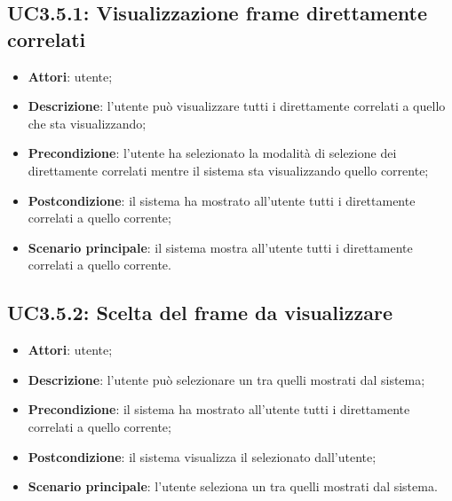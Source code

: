 \subsection{UC3.5.1: Visualizzazione frame direttamente correlati}
\label{UC3.5.1}
\begin{itemize}
\item \textbf{Attori}: utente;
\item \textbf{Descrizione}: l'utente può visualizzare tutti i  direttamente correlati a quello che sta visualizzando;
\item \textbf{Precondizione}: l’utente ha selezionato la modalità di selezione dei  direttamente correlati mentre il sistema sta visualizzando quello corrente;
\item \textbf{Postcondizione}: il sistema ha mostrato all'utente tutti i  direttamente correlati a quello corrente;
\item \textbf{Scenario principale}:
il sistema mostra all'utente tutti i  direttamente correlati a quello corrente.
\end{itemize}
\subsection{UC3.5.2: Scelta del frame da visualizzare}
\label{UC3.5.2}
\begin{itemize}
\item \textbf{Attori}: utente;
\item \textbf{Descrizione}: l'utente può selezionare un  tra quelli mostrati dal sistema;
\item \textbf{Precondizione}: il sistema ha mostrato all'utente tutti i  direttamente correlati a quello corrente;
\item \textbf{Postcondizione}: il sistema visualizza il  selezionato dall'utente;
\item \textbf{Scenario principale}:
l'utente seleziona un  tra quelli mostrati dal sistema.
\end{itemize}
